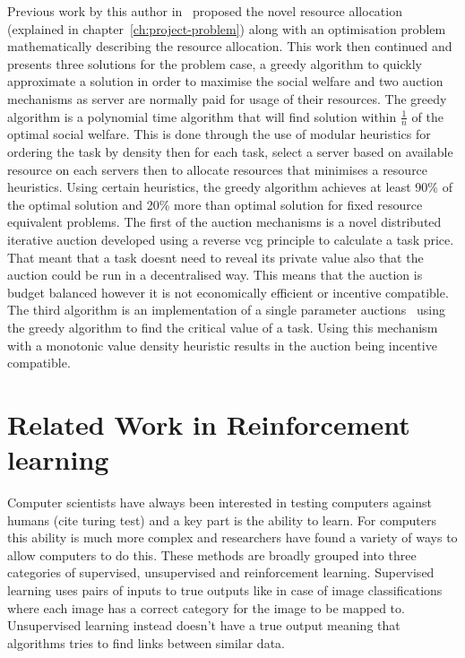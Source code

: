 Previous work by this author in~\cite{FlexibleResourceAllocation} proposed the novel resource allocation (explained in
chapter~\ref{ch:project-problem}) along with an optimisation problem mathematically describing the resource allocation.
This work then continued and presents three solutions for the problem case, a greedy algorithm to quickly approximate
a solution in order to maximise the social welfare and two auction mechanisms as server are normally paid for usage
of their resources. The greedy algorithm is a polynomial time algorithm that will find solution within $\frac{1}{n}$
of the optimal social welfare. This is done through the use of modular heuristics for ordering the task by density
then for each task, select a server based on available resource on each servers then to allocate resources that
minimises a resource heuristics. Using certain heuristics, the greedy algorithm achieves at least 90\% of the optimal
solution and 20\% more than optimal solution for fixed resource equivalent problems. The first of the auction mechanisms
is a novel distributed iterative auction developed using a reverse vcg principle to calculate a task price. That meant
that a task doesnt need to reveal its private value also that the auction could be run in a decentralised way.
This means that the auction is budget balanced however it is not economically efficient or incentive compatible.
The third algorithm is an implementation of a single parameter auctions~\citep{nisan2007algorithmic_critical_value}
using the greedy algorithm to find the critical value of a task. Using this mechanism with a monotonic value density
heuristic results in the auction being incentive compatible.

\section{Related Work in Reinforcement learning}\label{sec:related-work-in-machine-learning}
Computer scientists have always been interested in testing computers against humans (cite turing test) and a key part
is the ability to learn. For computers this ability is much more complex and researchers have
found a variety of ways to allow computers to do this. These methods are broadly grouped into three categories of
supervised, unsupervised and reinforcement learning. Supervised learning uses pairs of inputs to true outputs like in
case of image classifications where each image has a correct category for the image to be mapped to. Unsupervised
learning instead doesn't have a true output meaning that algorithms tries to find links between similar data.

